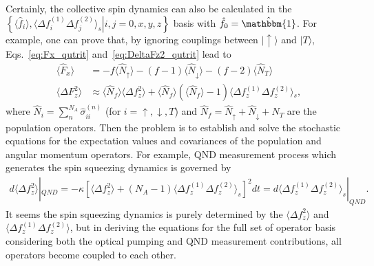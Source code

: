 \documentclass[preprint,aps,pra,onecolumn,superscriptaddress]{revtex4-1} %
\def\ket#1{\lvert{#1}\rangle}%
\newcommand{\expect}[1]{\big\langle #1 \big\rangle}
\begin{document}
\begin{appendix}
Certainly, the collective spin dynamics can also be calculated in the $ \left\{\left.\expect{\hat{f}_i},\expect{\Delta f_i^{(1)}\Delta f_j^{(2)} }_s\right|i,j=0,x,y,z \right\} $ basis with $ \hat{f}_0=\hat{\mathbbm{1}} $. For example, one can prove that, by ignoring couplings between $ \ket{\uparrow} $ and $ \ket{T} $, Eqs.~\ref{eq:Fx_qutrit} and~\ref{eq:DeltaFz2_qutrit} lead to 
\begin{subequations}
\begin{align}
\expect{\hat{F}_x} &= -f \expect{\hat{N}_\uparrow}-(f-1)\expect{\hat{N}_\downarrow}-(f-2)\expect{\hat{N}_T}\\
\expect{\Delta F_z^2} &\approx \expect{\hat{N}_f}\expect{\Delta f_z^2}+\expect{\hat{N}_f}(\expect{\hat{N}_f}-1)\expect{\Delta f_z^{(1)}\Delta f_z^{(2)} }\!_s,
\end{align}
\end{subequations}
where $ \hat{N}_i=\sum_n^{N_A}\hat{\sigma}_{ii}^{(n)} $ (for $ i=\uparrow,\downarrow,T $) and $ \hat{N}_f=\hat{N}_\uparrow+\hat{N}_\downarrow+\hat{N}_T $ are the population operators. Then the problem is to establish and solve the stochastic equations for the expectation values and covariances of the population and angular momentum operators. For example, QND measurement process which generates the spin squeezing dynamics is governed by
\begin{align}
d\expect{\Delta f_z^2}|_{QN\!D} = -\kappa \left[\expect{\Delta f_z^2}+(N_A-1)\expect{\Delta f_z^{(1)}\Delta f_z^{(2)} }_s \right]^2dt=d\expect{\Delta f_z^{(1)}\Delta f_z^{(2)} }_s|_{QN\!D}.
\end{align} 
It seems the spin squeezing dynamics is purely determined by the $ \expect{\Delta f_z^2} $ and $ \expect{\Delta f_z^{(1)}\Delta f_z^{(2)} }$, but in deriving the equations for the full set of operator basis considering both the optical pumping and QND measurement contributions, all operators become coupled to each other.


\end{appendix}
\end{document}
